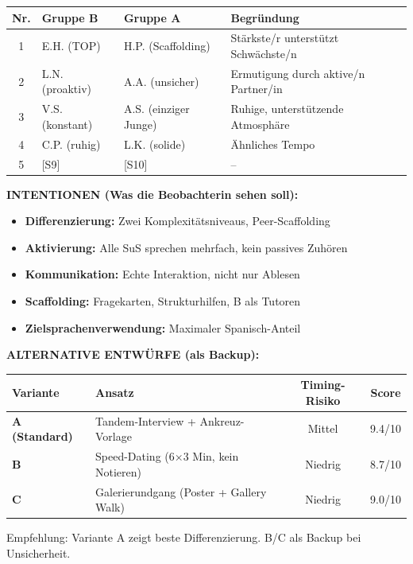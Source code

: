 \documentclass[11pt, a4paper]{article}
\begin{document}
\begin{beobachtungsbox}[title={DS 10 -- BEOBACHTUNGSSTUNDE (Di, 03.02.2026)}]
\begin{center}
\begin{tabular}{|c|l|l|l|}
\hline
\textbf{Nr.} & \textbf{Gruppe B} & \textbf{Gruppe A} & \textbf{Begründung} \\
\hline
1 & E.H. (TOP) & H.P. (Scaffolding) & Stärkste/r unterstützt Schwächste/n \\
\hline
2 & L.N. (proaktiv) & A.A. (unsicher) & Ermutigung durch aktive/n Partner/in \\
\hline
3 & V.S. (konstant) & A.S. (einziger Junge) & Ruhige, unterstützende Atmosphäre \\
\hline
4 & C.P. (ruhig) & L.K. (solide) & Ähnliches Tempo \\
\hline
5 & [S9] & [S10] & -- \\
\hline
\end{tabular}
\end{center}

\vspace{0.2cm}

\textbf{INTENTIONEN (Was die Beobachterin sehen soll):}
\begin{itemize}[leftmargin=1.5em, nosep]
    \item[$\checkmark$] \textbf{Differenzierung:} Zwei Komplexitätsniveaus, Peer-Scaffolding
    \item[$\checkmark$] \textbf{Aktivierung:} Alle SuS sprechen mehrfach, kein passives Zuhören
    \item[$\checkmark$] \textbf{Kommunikation:} Echte Interaktion, nicht nur Ablesen
    \item[$\checkmark$] \textbf{Scaffolding:} Fragekarten, Strukturhilfen, B als Tutoren
    \item[$\checkmark$] \textbf{Zielsprachenverwendung:} Maximaler Spanisch-Anteil
\end{itemize}

\vspace{0.3cm}

\textbf{ALTERNATIVE ENTWÜRFE (als Backup):}

\begin{center}
\begin{tabular}{|l|p{4cm}|c|c|}
\hline
\rowcolor{hellgrau}
\textbf{Variante} & \textbf{Ansatz} & \textbf{Timing-Risiko} & \textbf{Score} \\
\hline
\textbf{A (Standard)} & Tandem-Interview + Ankreuz-Vorlage & Mittel & 9.4/10 \\
\hline
\textbf{B} & Speed-Dating (6×3 Min, kein Notieren) & \textcolor{success}{Niedrig} & 8.7/10 \\
\hline
\textbf{C} & Galerierundgang (Poster + Gallery Walk) & \textcolor{success}{Niedrig} & 9.0/10 \\
\hline
\end{tabular}
\end{center}

{\small Empfehlung: Variante A zeigt beste Differenzierung. B/C als Backup bei Unsicherheit.}

\end{beobachtungsbox}
\end{document}
